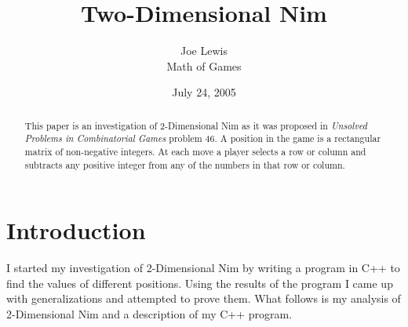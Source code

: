 \documentclass[11pt]{article}
\begin{document}
\title{Two-Dimensional Nim}
\author{Joe Lewis\\
	Math of Games}
\date{July 24, 2005}
\maketitle
\begin{abstract}
This paper is an investigation of 2-Dimensional Nim as it was proposed in {\it Unsolved Problems in Combinatorial Games} problem 46. A position in the game is a rectangular matrix of non-negative integers.  At each move a player selects a row or column and subtracts any positive integer from any of the numbers in that row or column.
\end{abstract}

\section{Introduction}
I started my investigation of 2-Dimensional Nim by writing a program in C++ to find the values of different positions.  Using the results of the program I came up with generalizations and attempted to prove them.  What follows is my analysis of 2-Dimensional Nim and a description of my C++ program.
\end{document}
